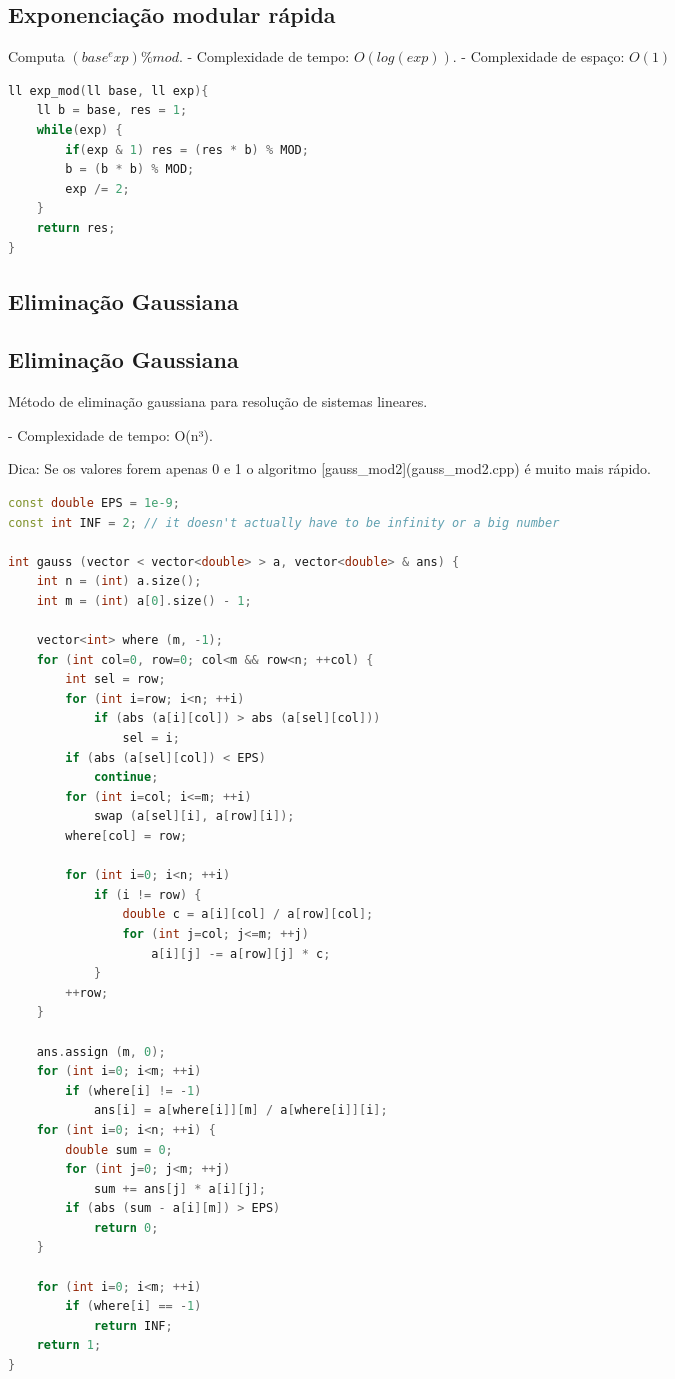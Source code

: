 \documentclass[11pt, a4paper, twoside]{article}
\begin{document}
\subsection{Exponenciação modular rápida}



Computa $(base^exp) \% mod$.
- Complexidade de tempo: $O(log(exp))$.
- Complexidade de espaço: $O(1)$

\begin{multicols}{2}
\begin{lstlisting}[language=C++]
ll exp_mod(ll base, ll exp){
    ll b = base, res = 1;
    while(exp) {
        if(exp & 1) res = (res * b) % MOD;
        b = (b * b) % MOD;
        exp /= 2;
    }
    return res;
}
\end{lstlisting}
\end{multicols}

\subsection{Eliminação Gaussiana}

\subsection{Eliminação Gaussiana}



Método de eliminação gaussiana para resolução de sistemas lineares.

- Complexidade de tempo: O(n³).


Dica: Se os valores forem apenas 0 e 1 o algoritmo [gauss\_mod2](gauss\_mod2.cpp) é muito mais rápido. 

\begin{lstlisting}[language=C++]
const double EPS = 1e-9;
const int INF = 2; // it doesn't actually have to be infinity or a big number

int gauss (vector < vector<double> > a, vector<double> & ans) {
    int n = (int) a.size();
    int m = (int) a[0].size() - 1;

    vector<int> where (m, -1);
    for (int col=0, row=0; col<m && row<n; ++col) {
        int sel = row;
        for (int i=row; i<n; ++i)
            if (abs (a[i][col]) > abs (a[sel][col]))
                sel = i;
        if (abs (a[sel][col]) < EPS)
            continue;
        for (int i=col; i<=m; ++i)
            swap (a[sel][i], a[row][i]);
        where[col] = row;

        for (int i=0; i<n; ++i)
            if (i != row) {
                double c = a[i][col] / a[row][col];
                for (int j=col; j<=m; ++j)
                    a[i][j] -= a[row][j] * c;
            }
        ++row;
    }

    ans.assign (m, 0);
    for (int i=0; i<m; ++i)
        if (where[i] != -1)
            ans[i] = a[where[i]][m] / a[where[i]][i];
    for (int i=0; i<n; ++i) {
        double sum = 0;
        for (int j=0; j<m; ++j)
            sum += ans[j] * a[i][j];
        if (abs (sum - a[i][m]) > EPS)
            return 0;
    }

    for (int i=0; i<m; ++i)
        if (where[i] == -1)
            return INF;
    return 1;
}
\end{lstlisting}
\end{document}
